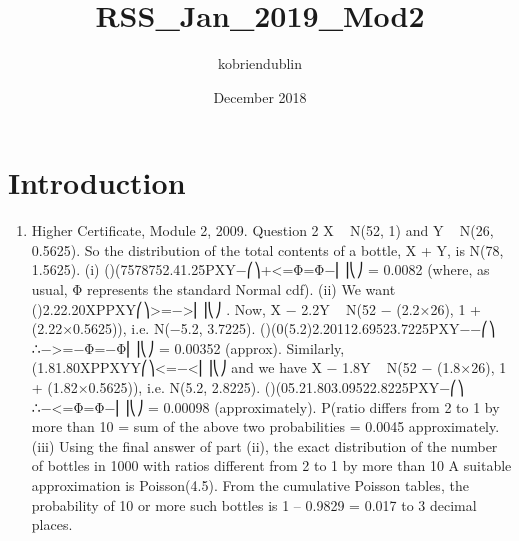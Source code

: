 \documentclass{article}
\title{RSS_Jan_2019_Mod2}
\author{kobriendublin }
\date{December 2018}
\begin{document}
\maketitle

\section{Introduction}

\begin{enumerate}
    \item Higher Certificate, Module 2, 2009. Question 2
X ~ N(52, 1) and Y ~ N(26, 0.5625).
So the distribution of the total contents of a bottle, X + Y, is N(78, 1.5625).
(i) ()(7578752.41.25PXY−⎛⎞+<=Φ=Φ−⎜⎟⎝⎠ = 0.0082
(where, as usual, Φ represents the standard Normal cdf).
(ii) We want ()2.22.20XPPXY⎛⎞>=−>⎜⎟⎝⎠ .
Now, X − 2.2Y ~ N(52 − (2.2×26), 1 + (2.22×0.5625)), i.e. N(−5.2, 3.7225).
()(0(5.2)2.20112.69523.7225PXY−−⎛⎞ ∴−>=−Φ=−Φ⎜⎟⎝⎠ = 0.00352 (approx).
Similarly, (1.81.80XPPXYY⎛⎞<=−<⎜⎟⎝⎠ and we have
X − 1.8Y ~ N(52 − (1.8×26), 1 + (1.82×0.5625)), i.e. N(5.2, 2.8225).
()(05.21.803.09522.8225PXY−⎛⎞ ∴−<=Φ=Φ−⎜⎟⎝⎠ = 0.00098 (approximately).
P(ratio differs from 2 to 1 by more than 10%
= sum of the above two probabilities = 0.0045 approximately.
(iii) Using the final answer of part (ii), the exact distribution of the number of bottles in 1000 with ratios different from 2 to 1 by more than 10%
A suitable approximation is Poisson(4.5).
From the cumulative Poisson tables, the probability of 10 or more such bottles is 1 – 0.9829 = 0.017 to 3 decimal places.

\end{enumerate}
\end{document}
